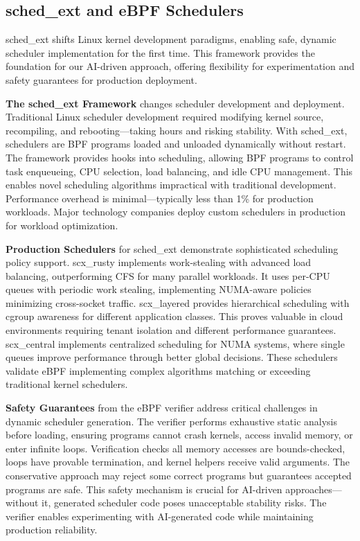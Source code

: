 \subsection{sched\_ext and eBPF Schedulers}

sched\_ext shifts Linux kernel development paradigms, enabling safe, dynamic scheduler implementation for the first time. This framework provides the foundation for our AI-driven approach, offering flexibility for experimentation and safety guarantees for production deployment.

\textbf{The sched\_ext Framework} changes scheduler development and deployment. Traditional Linux scheduler development required modifying kernel source, recompiling, and rebooting—taking hours and risking stability. With sched\_ext, schedulers are BPF programs loaded and unloaded dynamically without restart. The framework provides hooks into scheduling, allowing BPF programs to control task enqueueing, CPU selection, load balancing, and idle CPU management. This enables novel scheduling algorithms impractical with traditional development. Performance overhead is minimal—typically less than 1\% for production workloads. Major technology companies deploy custom schedulers in production for workload optimization.

\textbf{Production Schedulers} for sched\_ext demonstrate sophisticated scheduling policy support. scx\_rusty implements work-stealing with advanced load balancing, outperforming CFS for many parallel workloads. It uses per-CPU queues with periodic work stealing, implementing NUMA-aware policies minimizing cross-socket traffic. scx\_layered provides hierarchical scheduling with cgroup awareness for different application classes. This proves valuable in cloud environments requiring tenant isolation and different performance guarantees. scx\_central implements centralized scheduling for NUMA systems, where single queues improve performance through better global decisions. These schedulers validate eBPF implementing complex algorithms matching or exceeding traditional kernel schedulers.

\textbf{Safety Guarantees} from the eBPF verifier address critical challenges in dynamic scheduler generation. The verifier performs exhaustive static analysis before loading, ensuring programs cannot crash kernels, access invalid memory, or enter infinite loops. Verification checks all memory accesses are bounds-checked, loops have provable termination, and kernel helpers receive valid arguments. The conservative approach may reject some correct programs but guarantees accepted programs are safe. This safety mechanism is crucial for AI-driven approaches—without it, generated scheduler code poses unacceptable stability risks. The verifier enables experimenting with AI-generated code while maintaining production reliability.

